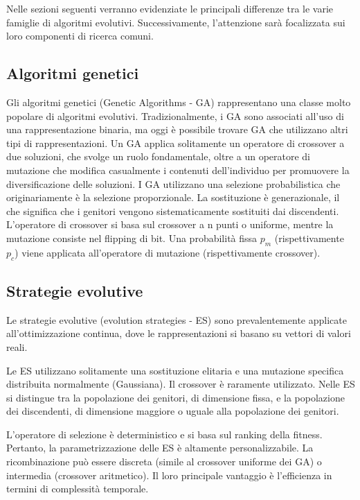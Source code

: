 Nelle sezioni seguenti verranno evidenziate le principali differenze tra le varie famiglie di algoritmi evolutivi. Successivamente, l'attenzione sarà focalizzata sui loro componenti di ricerca comuni.

\subsection{Algoritmi genetici}

Gli algoritmi genetici (Genetic Algorithms - GA) rappresentano una classe molto popolare di algoritmi evolutivi. Tradizionalmente, i GA sono associati all'uso di una rappresentazione binaria, ma oggi è possibile trovare GA che utilizzano altri tipi di rappresentazioni. Un GA applica solitamente un operatore di crossover a due soluzioni, che svolge un ruolo fondamentale, oltre a un operatore di mutazione che modifica casualmente i contenuti dell'individuo per promuovere la diversificazione delle soluzioni. I GA utilizzano una selezione probabilistica che originariamente è la selezione proporzionale. La sostituzione è generazionale, il che significa che i genitori vengono sistematicamente sostituiti dai discendenti. L'operatore di crossover si basa sul crossover a n punti o uniforme, mentre la mutazione consiste nel flipping di bit. Una probabilità fissa $p_m$ (rispettivamente $p_c$) viene applicata all'operatore di mutazione (rispettivamente crossover).

\subsection{Strategie evolutive}

Le strategie evolutive (evolution strategies - ES) sono prevalentemente applicate all'ottimizzazione continua, dove le rappresentazioni si basano su vettori di valori reali.

Le ES utilizzano solitamente una sostituzione elitaria e una mutazione specifica distribuita normalmente (Gaussiana). Il crossover è raramente utilizzato. Nelle ES si distingue tra la popolazione dei genitori, di dimensione fissa, e la popolazione dei discendenti, di dimensione maggiore o uguale alla popolazione dei genitori. 

L'operatore di selezione è deterministico e si basa sul ranking della fitness. Pertanto, la parametrizzazione delle ES è altamente personalizzabile. La ricombinazione può essere discreta (simile al crossover uniforme dei GA) o intermedia (crossover aritmetico). Il loro principale vantaggio è l'efficienza in termini di complessità temporale.

